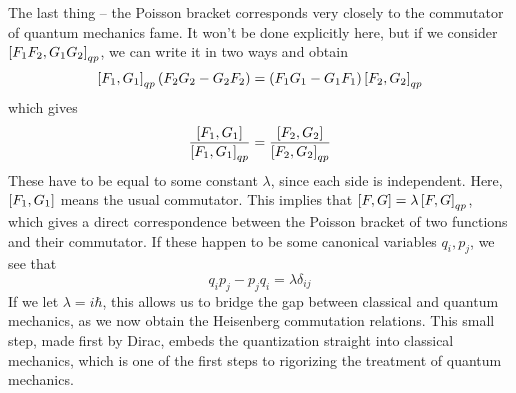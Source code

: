 The last thing -- the Poisson bracket corresponds very closely to the commutator of quantum mechanics fame. It won't be done explicitly here, but if we consider $\left[F_1F_2, G_1G_2\right]_{qp}$, we can write it in two ways and obtain 
\[
	\left[F_1, G_1\right]_{qp}(F_2G_2-G_2F_2) = (F_1G_1-G_1F_1)\left[F_2, G_2\right]_{qp}
\]
which gives 
\[
	 \frac{\left[F_1, G_1\right]}{\left[F_1, G_1\right]_{qp}} = \frac{\left[F_2, G_2\right]}{\left[F_2, G_2\right]_{qp}}
\]
These have to be equal to some constant $\lambda$, since each side is independent. Here, $\left[F_1, G_1\right]$ means the usual commutator. This implies that $\left[F, G\right] = \lambda \left[F, G\right]_{qp}$, which gives a direct correspondence between the Poisson bracket of two functions and their commutator. If these happen to be some canonical variables $q_i, p_j$, we see that 
\[
	q_i p_j - p_j q_i = \lambda \delta_{ij}
\]
If we let $\lambda = i\hbar$, this allows us to bridge the gap between classical and quantum mechanics, as we now obtain the Heisenberg commutation relations. This small step, made first by Dirac, embeds the quantization straight into classical mechanics, which is one of the first steps to rigorizing the treatment of quantum mechanics. 
